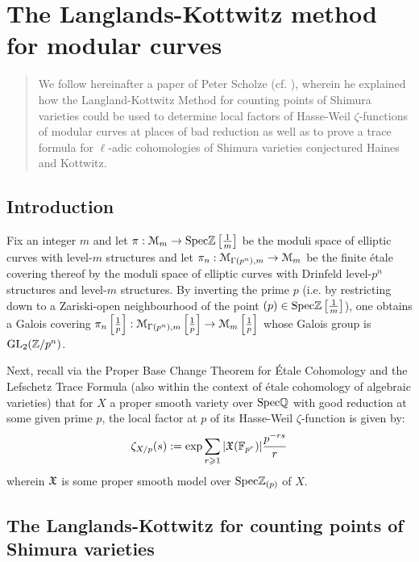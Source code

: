 \chapter{The Langlands-Kottwitz method for modular curves}
    \begin{abstract}
        We follow hereinafter a paper of Peter Scholze (cf. \cite{scholze_langlands_kottwitz_for_modular_curves}), wherein he explained how the Langland-Kottwitz Method for counting points of Shimura varieties could be used to determine local factors of Hasse-Weil $\zeta$-functions of modular curves at places of bad reduction as well as to prove a trace formula for $\ell$-adic cohomologies of Shimura varieties conjectured Haines and Kottwitz.
    \end{abstract}
    
    \minitoc
    
    \section{Introduction}
        Fix an integer $m$ and let $\pi: \mathcal{M}_m \to \mathrm{Spec} \mathbb{Z}\left[\frac1m\right]$ be the moduli space of elliptic curves with level-$m$ structures and let $\pi_n: \mathcal{M}_{\Gamma(p^n), m} \to \mathcal{M}_m$ be the finite \'etale covering thereof by the moduli space of elliptic curves with Drinfeld level-$p^n$ structures and level-$m$ structures. By inverting the prime $p$ (i.e. by restricting down to a Zariski-open neighbourhood of the point $(p) \in \mathrm{Spec} \mathbb{Z}\left[\frac1m\right]$), one obtains a Galois covering $\pi_n\left[\frac1p\right]: \mathcal{M}_{\Gamma(p^n), m}\left[\frac1p\right] \to \mathcal{M}_m\left[\frac1p\right]$ whose Galois group is $\operatorname{GL}_2(\mathbb{Z}/p^n)$.
        
        Next, recall via the Proper Base Change Theorem for \'Etale Cohomology and the Lefschetz Trace Formula (also within the context of \'etale cohomology of algebraic varieties) that for $X$ a proper smooth variety over $\mathrm{Spec} \mathbb{Q}$ with good reduction at some given prime $p$, the local factor at $p$ of its Hasse-Weil $\zeta$-function is given by:
            $$\zeta_{X/p}(s) := \exp \sum_{r \geqslant 1} |\mathfrak{X}(\mathbb{F}_{p^r})| \frac{p^{-rs}}{r}$$
        wherein $\mathfrak{X}$ is some proper smooth model over $\mathrm{Spec} \mathbb{Z}_{(p)}$ of $X$.
    
    \section{The Langlands-Kottwitz for counting points of Shimura varieties}